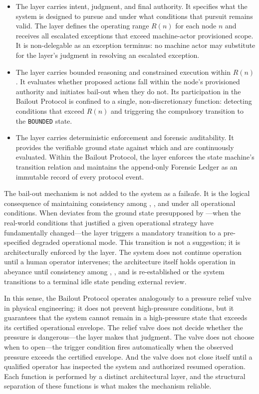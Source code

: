 \begin{itemize}
  \item[\textbf{\purpose.}] The \purpose layer carries intent, judgment, and final authority. It specifies what the system is designed to pursue and under what conditions that pursuit remains valid. The \purpose layer defines the operating range $R(n)$ for each node $n$ and receives all escalated exceptions that exceed machine-actor provisioned scope. It is non-delegable as an exception terminus: no machine actor may substitute for the \purpose layer's judgment in resolving an escalated exception.
  \item[\textbf{\bounds.}] The \bounds layer carries bounded reasoning and constrained execution within $R(n)$. It evaluates whether proposed actions fall within the node's provisioned authority and initiates bail-out when they do not. Its participation in the Bailout Protocol is confined to a single, non-discretionary function: detecting conditions that exceed $R(n)$ and triggering the compulsory transition to the \texttt{BOUNDED} state.
  \item[\textbf{\fact.}] The \fact layer carries deterministic enforcement and forensic auditability. It provides the verifiable ground state against which \purpose and \bounds are continuously evaluated. Within the Bailout Protocol, the \fact layer enforces the state machine's transition relation and maintains the append-only Forensic Ledger as an immutable record of every protocol event.
\end{itemize}

The bail-out mechanism is not added to the system as a failsafe. It is the logical consequence of maintaining consistency among \purpose, \bounds, and \fact under all operational conditions. When \fact deviates from the ground state presupposed by \purpose—when the real-world conditions that justified a given operational strategy have fundamentally changed—the \bounds layer triggers a mandatory transition to a pre-specified degraded operational mode. This transition is not a suggestion; it is architecturally enforced by the \fact layer. The system does not continue operation until a human operator intervenes; the architecture itself holds operation in abeyance until consistency among \purpose, \bounds, and \fact is re-established or the system transitions to a terminal idle state pending external review.

In this sense, the \bxthree Bailout Protocol operates analogously to a pressure relief valve in physical engineering: it does not prevent high-pressure conditions, but it guarantees that the system cannot remain in a high-pressure state that exceeds its certified operational envelope. The relief valve does not decide whether the pressure is dangerous—the \purpose layer makes that judgment. The valve does not choose when to open—the trigger condition fires automatically when the observed pressure exceeds the certified envelope. And the valve does not close itself until a qualified operator has inspected the system and authorized resumed operation. Each function is performed by a distinct architectural layer, and the structural separation of these functions is what makes the mechanism reliable.

